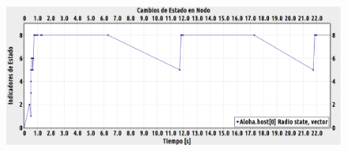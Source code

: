 \begin{justify}
\begin{figure}[!ht]
\includegraphics[width=13cm,height=30cm,keepaspectratio]{images/cambioestado1nodo-ideal.eps}

\end{figure}
\end{justify}
